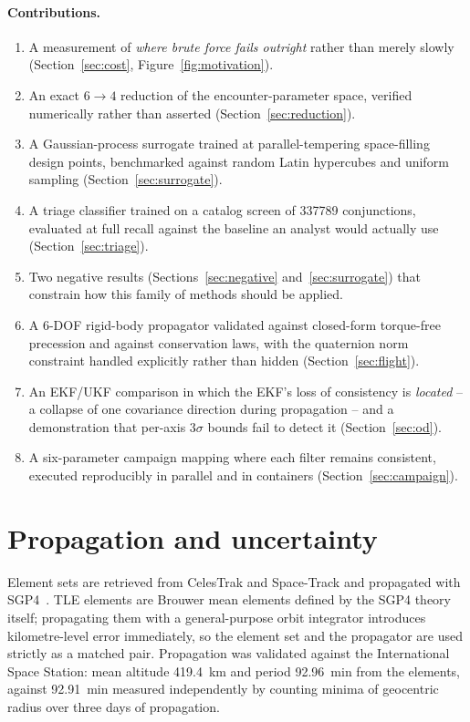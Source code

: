 \documentclass[11pt]{article}
\begin{document}
\paragraph{Contributions.}
\begin{enumerate}
  \item A measurement of \emph{where brute force fails outright} rather than
        merely slowly (Section~\ref{sec:cost}, Figure~\ref{fig:motivation}).
  \item An exact $6 \to 4$ reduction of the encounter-parameter space,
        verified numerically rather than asserted
        (Section~\ref{sec:reduction}).
  \item A Gaussian-process surrogate trained at parallel-tempering
        space-filling design points, benchmarked against random Latin
        hypercubes and uniform sampling (Section~\ref{sec:surrogate}).
  \item A triage classifier trained on a catalog screen of \num{337789}
        conjunctions, evaluated at full recall against the baseline an
        analyst would actually use (Section~\ref{sec:triage}).
  \item Two negative results (Sections~\ref{sec:negative}
        and~\ref{sec:surrogate}) that constrain how this family of methods
        should be applied.
  \item A 6-DOF rigid-body propagator validated against closed-form
        torque-free precession and against conservation laws, with the
        quaternion norm constraint handled explicitly rather than hidden
        (Section~\ref{sec:flight}).
  \item An EKF/UKF comparison in which the EKF's loss of consistency is
        \emph{located} -- a collapse of one covariance direction during
        propagation -- and a demonstration that per-axis $3\sigma$ bounds
        fail to detect it (Section~\ref{sec:od}).
  \item A six-parameter campaign mapping where each filter remains
        consistent, executed reproducibly in parallel and in containers
        (Section~\ref{sec:campaign}).
\end{enumerate}

\section{Propagation and uncertainty}\label{sec:uncertainty}

Element sets are retrieved from CelesTrak and Space-Track and propagated
with SGP4~\cite{hoots,vallado}. TLE elements are Brouwer mean elements defined by the SGP4 theory
itself; propagating them with a general-purpose orbit integrator introduces
kilometre-level error immediately, so the element set and the propagator are
used strictly as a matched pair. Propagation was validated against the
International Space Station: mean altitude \SI{419.4}{\kilo\meter} and
period \SI{92.96}{\minute} from the elements, against
\SI{92.91}{\minute} measured independently by counting minima of geocentric
radius over three days of propagation.
\end{document}
